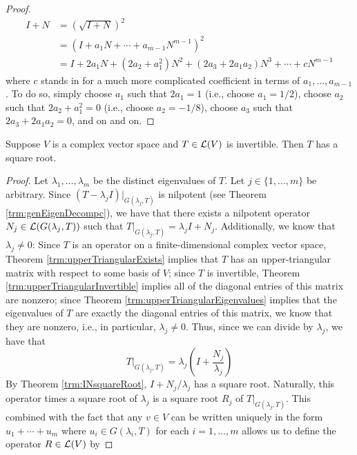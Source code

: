 \documentclass[../main.tex]{subfiles}
\begin{document}
\begin{itemize}
\begin{theorem}
\begin{proof}
            \begin{align*}
                I+N &= \left( \sqrt{I+N} \right)^2\\
                &= \left( I+a_1N+\cdots+a_{m-1}N^{m-1} \right)^2\\
                &= I+2a_1N+(2a_2+a_1^2)N^2+(2a_3+2a_1a_2)N^3+\cdots+cN^{m-1}
            \end{align*}
            where $c$ stands in for a much more complicated coefficient in terms of $a_1,\dots,a_{m-1}$. To do so, simply choose $a_1$ such that $2a_1=1$ (i.e., choose $a_1=1/2$), choose $a_2$ such that $2a_2+a_1^2=0$ (i.e., choose $a_2=-1/8$), choose $a_3$ such that $2a_3+2a_1a_2=0$, and on and on.
        \end{proof}
    \end{theorem}
    \begin{theorem}
        Suppose $V$ is a complex vector space and $T\in\mathcal{L}(V)$ is invertible. Then $T$ has a square root.
        \begin{proof}
            Let $\lambda_1,\dots,\lambda_m$ be the distinct eigenvalues of $T$. Let $j\in\{1,\dots,m\}$ be arbitrary. Since $(T-\lambda_jI)|_{G(\lambda_j,T)}$ is nilpotent (see Theorem \ref{trm:genEigenDecompc}), we have that there exists a nilpotent operator $N_j\in\mathcal{L}(G(\lambda_j,T))$ such that $T|_{G(\lambda_j,T)}=\lambda_jI+N_j$. Additionally, we know that $\lambda_j\neq 0$: Since $T$ is an operator on a finite-dimensional complex vector space, Theorem \ref{trm:upperTriangularExists} implies that $T$ has an upper-triangular matrix with respect to some basis of $V$; since $T$ is invertible, Theorem \ref{trm:upperTriangularInvertible} implies all of the diagonal entries of this matrix are nonzero; since Theorem \ref{trm:upperTriangularEigenvalues} implies that the eigenvalues of $T$ are exactly the diagonal entries of this matrix, we know that they are nonzero, i.e., in particular, $\lambda_j\neq 0$. Thus, since we can divide by $\lambda_j$, we have that
            \begin{equation*}
                T|_{G(\lambda_j,T)} = \lambda_j\left( I+\frac{N_j}{\lambda_j} \right)
            \end{equation*}
            By Theorem \ref{trm:INsquareRoot}, $I+N_j/\lambda_j$ has a square root. Naturally, this operator times a square root of $\lambda_j$ is a square root $R_j$ of $T|_{G(\lambda_j,T)}$. This combined with the fact that any $v\in V$ can be written uniquely in the form $u_1+\cdots+u_m$ where $u_i\in G(\lambda_i,T)$ for each $i=1,\dots,m$ allows us to define the operator $R\in\mathcal{L}(V)$ by

\end{proof}
\end{theorem}
\end{itemize}
\end{document}
